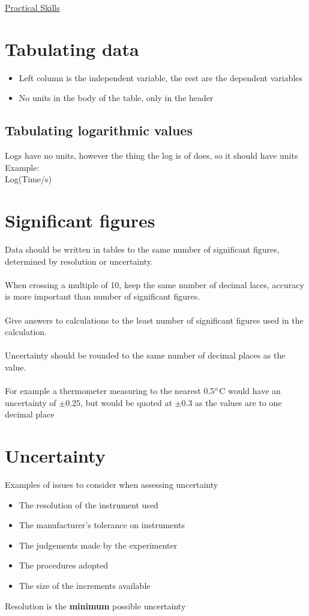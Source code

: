 \documentclass{article}[18pt]
\begin{document}
\begin{center}
\underline{\huge Practical Skills}
\end{center}
\section{Tabulating data}
\begin{itemize}
\item Left column is the independent variable, the rest are the dependent variables
\item No units in the body of the table, only in the header
\end{itemize}
\subsection{Tabulating logarithmic values}
Logs have no units, however the thing the log is of does, so it should have units\\
Example:\\
Log(Time/s)
\section{Significant figures}
Data should be written in tables to the same number of significant figures, determined by resolution or uncertainty.\\
\\
When crossing a multiple of 10, keep the same number of decimal laces, accuracy is more important than number of significant figures.\\
\\
Give answers to calculations to the least number of significant figures used in the calculation.\\
\\
Uncertainty should be rounded to the same number of decimal places as the value.\\
\\
For example a thermometer measuring to the nearest 0.5$\degree$C would have an uncertainty of $\pm 0.25$, but would be quoted at $\pm 0.3$ as the values are to one decimal place
\section{Uncertainty}
Examples of issues to consider when assessing uncertainty
\begin{itemize}
\item The resolution of the instrument used
\item The manufacturer's tolerance on instruments
\item The judgements made by the experimenter
\item The procedures adopted
\item The size of the increments available
\end{itemize}
Resolution is the \textbf{minimum} possible uncertainty
\end{document}
